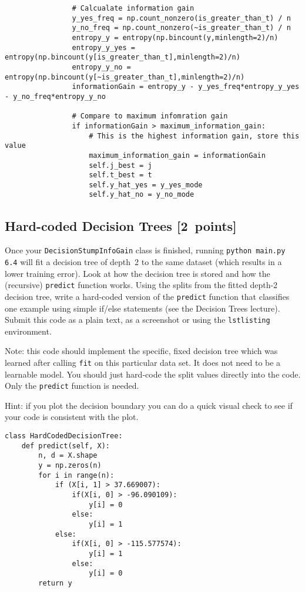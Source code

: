 \documentclass{article}
\newcommand{\blu}[1]{{\textcolor{blu}{#1}}}
\let\ask\blu
\newcommand\pts[1]{\textcolor{pointscolour}{[#1~points]}}
\begin{document}
\begin{verbatim}
                # Calcualate information gain
                y_yes_freq = np.count_nonzero(is_greater_than_t) / n
                y_no_freq = np.count_nonzero(~is_greater_than_t) / n
                entropy_y = entropy(np.bincount(y,minlength=2)/n)
                entropy_y_yes = entropy(np.bincount(y[is_greater_than_t],minlength=2)/n)
                entropy_y_no = entropy(np.bincount(y[~is_greater_than_t],minlength=2)/n)
                informationGain = entropy_y - y_yes_freq*entropy_y_yes - y_no_freq*entropy_y_no

                # Compare to maximum infomration gain
                if informationGain > maximum_information_gain:
                    # This is the highest information gain, store this value
                    maximum_information_gain = informationGain
                    self.j_best = j
                    self.t_best = t
                    self.y_hat_yes = y_yes_mode
                    self.y_hat_no = y_no_mode

\end{verbatim}
\newpage

  \subsection{Hard-coded Decision Trees \pts{2}}

  Once your \texttt{DecisionStumpInfoGain} class is finished, running \texttt{python main.py 6.4} will fit
  a decision tree of depth~2 to the same dataset (which results in a lower training error).
  Look at how the decision tree is stored and how the (recursive) \texttt{predict} function works.
  \ask{Using the splits from the fitted depth-2 decision tree, write a hard-coded version of the \texttt{predict}
  function that classifies one example using simple if/else statements
  (see the Decision Trees lecture). Submit this code as a plain text, as a screenshot or using the \texttt{lstlisting} environment.}

  Note: this code should implement the specific, fixed decision tree
  which was learned after calling \texttt{fit} on this particular data set. It does not need to be a learnable model.
  You should just hard-code the split values directly into the code.
  Only the \texttt{predict} function is needed.

  Hint: if you plot the decision boundary you can do a quick visual check to see if your code is consistent with the plot.

\begin{verbatim}
class HardCodedDecisionTree:
    def predict(self, X):
        n, d = X.shape
        y = np.zeros(n)
        for i in range(n):
            if (X[i, 1] > 37.669007):
                if(X[i, 0] > -96.090109):
                    y[i] = 0
                else:
                    y[i] = 1
            else:
                if(X[i, 0] > -115.577574):
                    y[i] = 1
                else:
                    y[i] = 0
        return y
\end{verbatim}
\newpage
\end{document}
